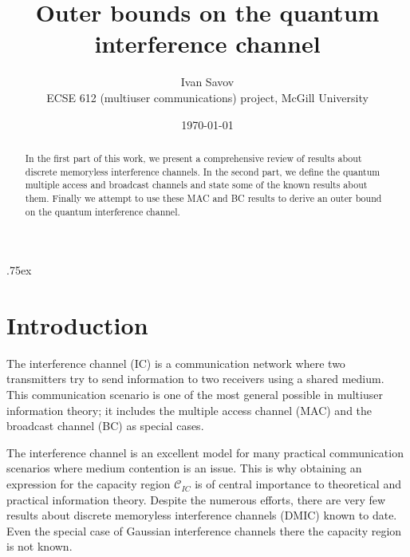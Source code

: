 \documentclass[aps,11pt,twoside,letterpaper]{article}
\newcommand{\ICcap}{  \ensuremath{\mathcal C}_{IC} }
\begin{document}
\title{{\Large Outer bounds on the quantum interference channel} }
\date{\today} 
\author{Ivan Savov \\
    ECSE 612 (multiuser communications) project, McGill University}




\parskip .75ex             %
\maketitle



\begin{abstract}
	In the first part of this work, we present a comprehensive review of
	results about discrete memoryless interference channels.
	In the second part, we define the quantum  multiple access and 
	broadcast channels and state some of the known results about them.
	Finally we attempt to use these MAC and BC results to derive 
	an outer bound on the quantum interference channel. 
\end{abstract}


\section{Introduction}


    The interference channel (IC) is a communication network where two transmitters try to send
    information to two receivers using a shared medium. 
    This communication scenario is one of the most general possible in multiuser information
    theory; it includes the multiple access channel (MAC) and the broadcast channel (BC)
    as special cases.
    
    The interference channel is an excellent model for many practical communication scenarios
    where medium contention is an issue. 
    This is why obtaining an expression for the capacity region $\ICcap$ 
    is of central importance to theoretical and practical information theory.
    Despite the numerous efforts, there are very few results about 
    discrete memoryless interference channels (DMIC) known to date.
    Even the special case of Gaussian interference channels there the capacity region is not known.
    
\end{document}
